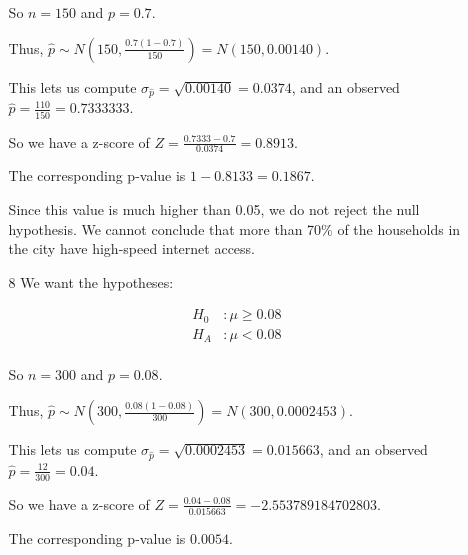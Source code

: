 \documentclass[12pt,letterpaper]{article}
\begin{document}
\begin{enumerate}
\begin{enumerate}
          So $n = 150$ and $p = 0.7$.

          Thus, $\hat{p} \sim N(150, \frac{0.7 (1 - 0.7)}{150}) = N(150, \num{0.00140})$.

          This lets us compute $\sigma_{\hat{p}} = \sqrt{\num{0.00140}} = \num{0.0374}$,
          and an observed $\hat{p} = \frac{110}{150} = \num{0.7333333}$.

          So we have a z-score of $Z = \frac{\num{0.7333} - 0.7}{\num{0.0374}} = 0.8913$.

          The corresponding p-value is $1 - 0.8133 = 0.1867$.

          Since this value is much higher than 0.05,
          we do not reject the null hypothesis.
          We cannot conclude that more than 70\% of the households in the city have high-speed internet access.
        \item [8]
          We want the hypotheses:

          \begin{align*}
            H_0 &: \mu \ge 0.08 \\
            H_A &: \mu < 0.08 \\
          \end{align*}

          So $n = 300$ and $p = 0.08$.

          Thus, $\hat{p} \sim N(300, \frac{0.08 (1 - 0.08)}{300}) = N(300, \num{0.0002453})$.

          This lets us compute $\sigma_{\hat{p}} = \sqrt{\num{0.0002453}} = \num{0.015663}$,
          and an observed $\hat{p} = \frac{12}{300} = \num{0.04}$.

          So we have a z-score of $Z = \frac{\num{0.04} - 0.08}{\num{0.015663}} = \num{-2.553789184702803}$.

          The corresponding p-value is $0.0054$.


\end{enumerate}
\end{enumerate}
\end{document}
